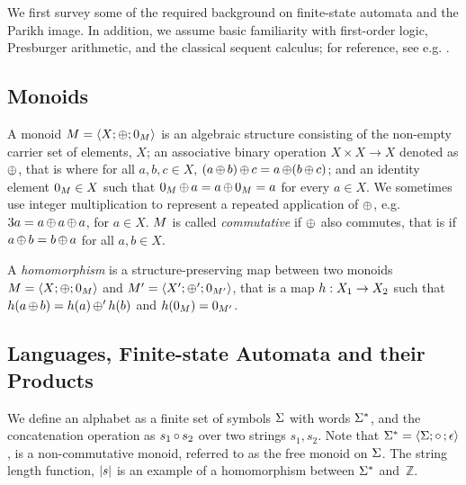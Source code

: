 We first survey some of the required background on finite-state
automata and the Parikh image. In addition, we assume basic familiarity
with first-order logic, Presburger
arithmetic, and the classical sequent calculus; for reference, see
e.g. \cite{Fitting96a}.

\subsection{Monoids}



A monoid $M = \left\langle X;\operatorname{\oplus};0_{M}\right\rangle$ is an algebraic structure
consisting of the non-empty carrier set of elements, $X$; an associative binary operation
$X \times X \rightarrow X$ denoted as $\operatorname{\oplus}$, that is where for all $a, b,
c \in X$, $(a \operatorname{\oplus} b) \operatorname{\oplus} c = a \operatorname{\oplus} (b \operatorname{\oplus} c)$; 
and an identity element $0_{M} \in X$ such that
$0_{M} \operatorname{\oplus} a = a \operatorname{\oplus} 0_{M} =   a$ for every $a \in X$.
We sometimes use integer multiplication to represent a repeated application of
$\operatorname{\oplus}$, e.g. $3a = a \operatorname{\oplus} a \operatorname{\oplus} a$, for $a \in X$. $M$ is
called \textit{commutative} if $\operatorname{\oplus}$ also commutes, that is if $a
\operatorname{\oplus} b = b \operatorname{\oplus} a$ for all $a, b \in X$. 

A \textit{homomorphism} is a structure-preserving map between two
monoids $M = \left\langle X;\operatorname{\oplus};0_{M}\right\rangle$ and
$M' = \left\langle X';\operatorname{\oplus}';0_{M'}\right\rangle$, that is a map
$h : X_1 \rightarrow X_2$ such that
$h(a \operatorname{\oplus} b) = h(a) \operatorname{\oplus}' h(b)$ and
$h(0_{M}) = 0_{M'}$.

\subsection{Languages, Finite-state Automata and their Products}
\label{sec:languages}

We define an alphabet as a finite set of symbols $\Sigma$ with words $\Sigma^*$, and
the concatenation operation as $s_1 \operatorname{\circ}{} s_2$ over two strings $s_1, s_2$.
Note that $\Sigma^* = \left\langle\Sigma;\operatorname{\circ}{};\epsilon\right\rangle$, is a
non-commutative monoid, referred to as the free monoid on $\Sigma$.
The string length
function, $|s|$ is an example of a homomorphism between $\Sigma^*$
and~$\mathbb{Z}$.


